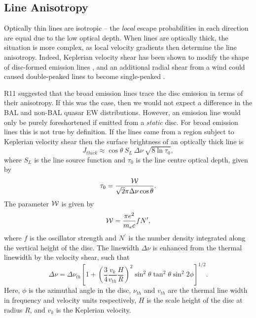 \subsection{Line Anisotropy}
\label{sec:line_aniso}

Optically thin lines are isotropic -- the {\em local}
escape probabilities in each direction are equal due to the 
low optical depth. 
When lines are optically thick, the situation is more
complex, as local velocity gradients then determine the line 
anisotropy. Indeed, Keplerian velocity shear has been shown to modify the
shape of disc-formed emission lines \citep{hornemarsh1986}, and an additional
radial shear from a wind could caused double-peaked lines
to become single-peaked \citep{MC96,MC97,flohic2012}.

R11 suggested that the broad emission lines trace the disc
emission in terms of their anisotropy. 
If this was the case, then we would not expect a difference in the BAL and non-BAL
quasar EW distributions. However, an emission line would only be purely 
foreshortened if emitted from a {\em static} disc. For broad emission lines
this is not true by definition. If the lines came from a region subject to
Keplerian velocity shear then the surface brightness of an optically thick 
line is \citep{hornemarsh1986}
\begin{equation}
J_{thick} \approx \cos \theta~S_L~\Delta \nu~\sqrt{8 \ln \tau_0},
\end{equation}
where $S_L$ is the line source function and
$\tau_0$ is the line centre optical depth, given by
\begin{equation}
\tau_0 = \frac{{\cal W}}{\sqrt{2}\pi \Delta \nu \cos \theta}.
\end{equation}
The parameter ${{\cal W}}$ is given by
\begin{equation}
{{\cal W}} = \frac{\pi e^2}{m_e c}f N^\prime,
\end{equation}
where $f$ is the oscillator strength and $N^\prime$ is the number
density integrated along the vertical height of the disc. The linewidth
$\Delta \nu$ is enhanced from the thermal linewidth by the velocity shear, such
that
\begin{equation}
\Delta \nu = \Delta \nu_{th} \left[1 + 
\left(\frac{3}{4}\frac{v_{k}}{v_{th}}\frac{H}{R}\right)^2
\sin^2 \theta \tan^2 \theta \sin^2 2 \phi
\right]^{1/2}.
\end{equation}
Here, $\phi$ is the azimuthal angle in the disc, $\nu_{th}$ and $v_{th}$ are the 
thermal line width in frequency and velocity units respectively, 
$H$ is the scale height of the disc at radius $R$, and $v_k$ is the
Keplerian velocity.

